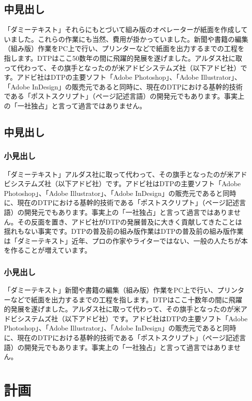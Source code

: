 \documentclass{cuxarticle}
\begin{document}
\section{中見出し}
「ダミーテキスト」それらにもとづいて組み版のオペレーターが紙面を作成していました。これらの作業にも当然、費用が掛かっていました。新聞や書籍の編集（組み版）作業をPC上で行い、プリンターなどで紙面を出力するまでの工程を指します。DTPはここ50数年の間に飛躍的発展を遂げました。アルダス社に取って代わって、その旗手となったのが米アドビシステムズ社（以下アドビ社）です。アドビ社はDTPの主要ソフト「Adobe Photoshop」、「Adobe Illustrator」、「Adobe InDesign」の販売元であると同時に、現在のDTPにおける基幹的技術である「ポストスクリプト」（ページ記述言語）の開発元でもあります。事実上の「一社独占」と言って過言ではありません。

\section{中見出し}
\subsection{小見出し}
「ダミーテキスト」アルダス社に取って代わって、その旗手となったのが米アドビシステムズ社（以下アドビ社）です。アドビ社はDTPの主要ソフト「Adobe Photoshop」、「Adobe Illustrator」、「Adobe InDesign」の販売元であると同時に、現在のDTPにおける基幹的技術である「ポストスクリプト」（ページ記述言語）の開発元でもあります。事実上の「一社独占」と言って過言ではありません。その反面を置き、アドビ社がDTPの発展普及に大きく貢献してきたことは揺れもない事実です。DTPの普及前の組み版作業はDTPの普及前の組み版作業は「ダミーテキスト」近年、プロの作家やライターではない、一般の人たちが本を作ることが増えています。

\subsection{小見出し}
「ダミーテキスト」新聞や書籍の編集（組み版）作業をPC上で行い、プリンターなどで紙面を出力するまでの工程を指します。DTPはここ十数年の間に飛躍的発展を遂げました。アルダス社に取って代わって、その旗手となったのが米アドビシステムズ社（以下アドビ社）です。アドビ社はDTPの主要ソフト「Adobe Photoshop」、「Adobe Illustrator」、「Adobe InDesign」の販売元であると同時に、現在のDTPにおける基幹的技術である「ポストスクリプト」（ページ記述言語）の開発元でもあります。事実上の「一社独占」と言って過言ではありません。

\chapter{計画}
\end{document}

